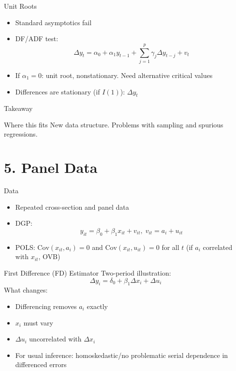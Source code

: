 \documentclass[aspectratio=169]{beamer}
\begin{document}
\begin{frame}{Unit Roots}
\begin{itemize}
	\item Standard asymptotics fail
	\item DF/ADF test: $$\Delta y_t = \alpha_0 + \alpha_1 y_{t-1} + \sum_{j=1}^p \gamma_j \Delta y_{t-j} + v_t$$
    \item If $\alpha_1=0$: unit root, nonstationary. Need alternative critical values
	\item Differences are stationary (if $I(1)$): $\Delta y_t$
\end{itemize}
\end{frame}

\begin{frame}{Takeaway}
\begin{block}{Where this fits}
    New data structure. Problems with sampling and spurious regressions. 
\end{block}
\end{frame}

\section{5. Panel Data}

\begin{frame}{Data}
    \begin{itemize}
        \item Repeated cross-section and panel data
        \item DGP: \[
y_{it}=\beta_0+\beta_1 x_{it}+v_{it}, \; v_{it}=a_i+u_{it}
\]
        \item POLS: $\mathrm{Cov}(x_{it},a_i)=0$ and $\mathrm{Cov}(x_{it},u_{it})=0$ for all $t$ (if $a_i$ correlated with $x_{it}$, OVB)
    \end{itemize}
\end{frame}

\begin{frame}{First Difference (FD) Estimator}
Two-period illustration:
\[
\Delta y_i = \delta_0 + \beta_1 \Delta x_i + \Delta u_i
\]
What changes:
\begin{itemize}
	\item Differencing removes $a_i$ exactly
	\item $x_i$ must vary
	\item $\Delta u_i$ uncorrelated with $\Delta x_i$
	\item For usual inference: homoskedastic/no problematic serial dependence in differenced errors
\end{itemize}
\end{frame}
\end{document}
